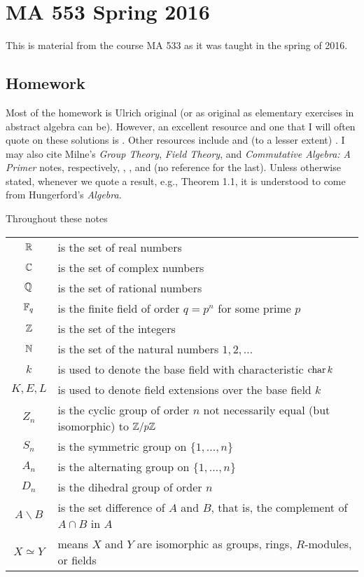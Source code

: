 \chapter{MA 553 Spring 2016}
\thispagestyle{empty}
This is material from the course MA 533 as it was taught in the spring of
2016.
\bigskip
\section{Homework}
Most of the homework is Ulrich original (or as original as elementary
exercises in abstract algebra can be). However, an excellent resource and
one that I will often quote on these solutions is \cite{hungerford}. Other
resources include \cite{dummit-foote} and (to a lesser extent)
\cite{herstein}. I may also cite Milne's \emph{Group Theory}, \emph{Field
  Theory}, and \emph{Commutative Algebra: A Primer} notes, respectively,
\cite{milneGT}, \cite{milneFT}, and (no reference for the last). Unless
otherwise stated, whenever we quote a result, e.g., Theorem 1.1, it is
understood to come from Hungerford's \emph{Algebra}.

Throughout these notes

\begin{tabular}{cl}
  $\mathbb{R}$   & is the set of real numbers\\
  $\mathbb{C}$   & is the set of complex numbers\\
  $\mathbb{Q}$   & is the set of rational numbers\\
  $\mathbb{F}_q$ & is the finite field of order $q=p^n$ for some prime $p$\\
  $\mathbb{Z}$   & is the set of the integers\\
  $\mathbb{N}$   & is the set of the natural numbers $1,2,\dotsc$\\
  $k$   & is used to denote the base field with
             characteristic $\operatorname{char} k$\\
  $K,E,L$& is used to denote field extensions over the base field
                    $k$\\
  $Z_n$    & is the cyclic group of order $n$ not necessarily equal
             (but isomorphic) to $\mathbb{Z}/p\mathbb{Z}$\\
  $S_n$    & is the symmetric group on $\{1,\dotsc,n\}$\\
  $A_n$    & is the alternating group on $\{1,\dotsc,n\}$\\
  $D_n$    & is the dihedral group of order $n$\\
  $A\smallsetminus B$ & is the set difference of $A$ and $B$, that is, the
                        complement of $A\cap B$ in $A$\\
  $X\simeq Y$ & means $X$ and $Y$ are isomorphic as groups, rings,
                $R$-modules, or fields
\end{tabular}

